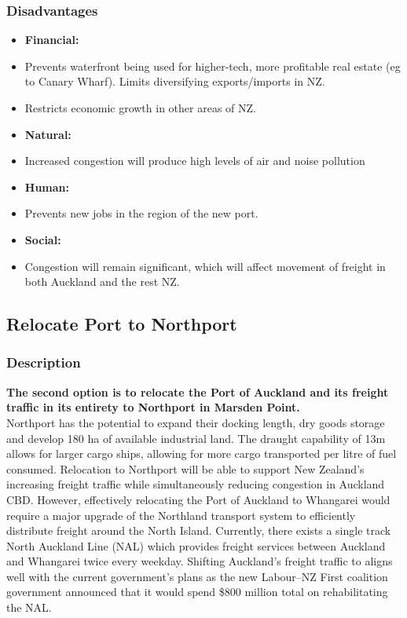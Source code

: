 \begin{multicols}{2}
    \subsubsection*{Disadvantages}
    \begin{itemize}[noitemsep]
        \item []\textbf{Financial: }
        \item{Prevents waterfront being used for higher-tech, more profitable real estate (eg to Canary Wharf). Limits diversifying exports/imports in NZ.}
        \item{Restricts economic growth in other areas of NZ.}
        \item []\textbf{Natural: }
        \item{Increased congestion will produce high levels of air and noise pollution}
        \item []\textbf{Human: }
        \item{Prevents new jobs in the region of the new port.}
        \item []\textbf{Social: }
        \item{Congestion will remain significant, which will affect movement of freight in both Auckland and the rest NZ.}
    \end{itemize}



\subsection*{Relocate Port to Northport}

    \subsubsection*{Description}
    \textbf{The second option is to relocate the Port of Auckland and its freight traffic in its entirety to Northport in Marsden Point.}
    \\Northport has the potential to expand their docking length, dry goods storage and develop 180 ha of available industrial land. The draught capability of 13m allows for larger cargo ships, allowing for more cargo transported per litre of fuel consumed. Relocation to Northport will be able to support New Zealand’s increasing freight traffic while simultaneously reducing congestion in Auckland CBD. However, effectively relocating the Port of Auckland to Whangarei would require a major upgrade of the Northland transport system to efficiently distribute freight around the North Island. Currently, there exists a single track North Auckland Line (NAL) which provides freight services between Auckland and Whangarei twice every weekday. Shifting Auckland's freight traffic to aligns well with the current government's plans as the new Labour–NZ First coalition government announced that it would spend \$800 million total on rehabilitating the NAL.


\end{multicols}
